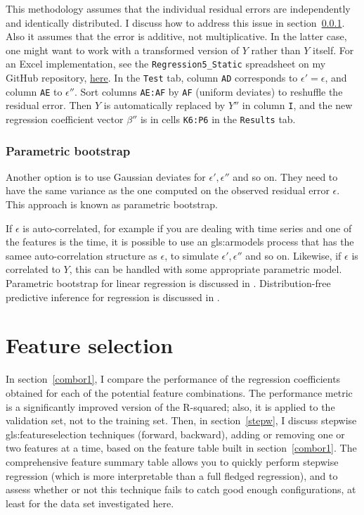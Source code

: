 \documentclass[oneside,10pt]{book}
\begin{document}
This methodology assumes that the individual residual errors are independently and identically distributed. I discuss how to address this issue in
section~\ref{rpb5}. Also it assumes that the error is additive, not multiplicative. In the latter case, one might want to work with a transformed version of $Y$ rather than $Y$ itself. For an Excel implementation, see the \texttt{Regression5\_Static} spreadsheet on my GitHub repository, \href{https://github.com/VincentGranville/Machine-Learning/blob/main/Spreadsheets/README.md}{here}. In the \texttt{Test} tab, column \texttt{AD} corresponds to $\epsilon'=\epsilon$, and column \texttt{AE} to $\epsilon''$. Sort columns \texttt{AE:AF} by \texttt{AF} (uniform deviates) to reshuffle the residual error.  Then $Y$ is automatically replaced by $Y''$ in
column  \texttt{I}, and the new regression coefficient vector $\beta''$ is in cells \texttt{K6:P6} in the \texttt{Results} tab.

\subsubsection{Parametric bootstrap}\label{rpb5}

Another option is to use Gaussian deviates for $\epsilon', \epsilon''$ and so on. They need to have the same variance as the one computed on the
observed residual error $\epsilon$. This approach is known as \textcolor{index}{parametric bootstrap}.

If $\epsilon$ is auto-correlated, for example if you are dealing with time series and one of the features is the time, it is possible to use an \gls{gls:armodels} process that has the samee auto-correlation structure as $\epsilon$, to simulate $\epsilon', \epsilon''$ and so on. Likewise, if $\epsilon$ is correlated to $Y$, this can be handled with some
appropriate parametric model. Parametric bootstrap for linear regression is discussed in \cite{parambr}. Distribution-free predictive inference for regression is discussed in \cite{predictrr}.


\section{Feature selection}

In section~\ref{combor1}, I compare the performance of the regression coefficients obtained for each of the potential feature combinations. The performance metric is a significantly improved version of  the R-squared; also, it is applied to the validation set, not to the training set. Then, in section~\ref{stepw}, I discuss stepwise \gls{gls:featureselection} techniques (forward, backward),
adding or removing one or two features at a time, based on the feature table built in section~\ref{combor1}. The comprehensive feature summary table allows
you to quickly perform stepwise regression (which is more interpretable than a full fledged regression), and to assess whether or not this technique fails to catch good enough configurations, at least for the data set investigated here.
\end{document}
